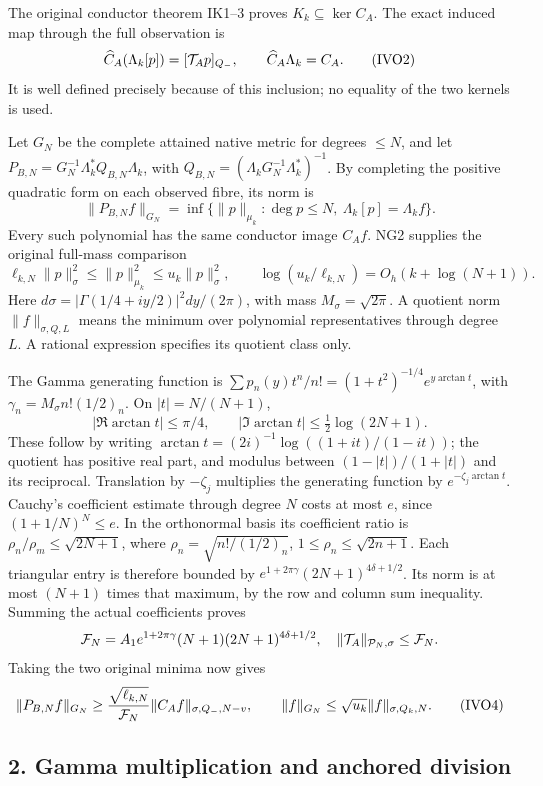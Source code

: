 The original conductor theorem IK1--3 proves \(K_k\subseteq\ker C_A\). The exact induced map through the full observation is \[
\widehat C_A(\Lambda_k[p])=[{\cal T}_Ap]_{Q_-},\qquad
\widehat C_A\Lambda_k=C_A.
\tag{IVO2}
\] It is well defined precisely because of this inclusion; no equality of the two kernels is used.

Let \(G_N\) be the complete attained native metric for degrees \(\le N\), and let \(P_{B,N}=G_N^{-1}\Lambda_k^*Q_{B,N}\Lambda_k\), with \(Q_{B,N}=(\Lambda_kG_N^{-1}\Lambda_k^*)^{-1}\). By completing the positive quadratic form on each observed fibre, its norm is \[
\|P_{B,N}f\|_{G_N}
=\inf\{\|p\|_{\mu_k}:\deg p\le N,\ \Lambda_k[p]=\Lambda_kf\}.
\] Every such polynomial has the same conductor image \(C_Af\). NG2 supplies the original full-mass comparison \[
\ell_{k,N}\|p\|_\sigma^2\le\|p\|_{\mu_k}^2\le u_k\|p\|_\sigma^2,\qquad
\log(u_k/\ell_{k,N})=O_h(k+\log(N+1)).
\tag{IVO3}
\] Here \(d\sigma=|\Gamma(1/4+iy/2)|^2dy/(2\pi)\), with mass \(M_\sigma=\sqrt{2\pi}\). A quotient norm \(\|f\|_{\sigma,Q,L}\) means the minimum over polynomial representatives through degree \(L\). A rational expression specifies its quotient class only.

The Gamma generating function is \(\sum p_n(y)t^n/n!=(1+t^2)^{-1/4}e^{y\arctan t}\), with \(\gamma_n=M_\sigma n!(1/2)_n\). On \(|t|=N/(N+1)\), \[
|\Re\arctan t|\le\pi/4,\qquad
|\Im\arctan t|\le\tfrac12\log(2N+1).
\] These follow by writing \(\arctan t=(2i)^{-1}\log((1+it)/(1-it))\); the quotient has positive real part, and modulus between \((1-|t|)/(1+|t|)\) and its reciprocal. Translation by \(-\zeta_j\) multiplies the generating function by \(e^{-\zeta_j\arctan t}\). Cauchy's coefficient estimate through degree \(N\) costs at most \(e\), since \((1+1/N)^N\le e\). In the orthonormal basis its coefficient ratio is \(\rho_n/\rho_m\le\sqrt{2N+1}\), where \(\rho_n=\sqrt{n!/(1/2)_n}\), \(1\le\rho_n\le\sqrt{2n+1}\). Each triangular entry is therefore bounded by \(e^{1+2\pi\gamma}(2N+1)^{4\delta+1/2}\). Its norm is at most \((N+1)\) times that maximum, by the row and column sum inequality. Summing the actual coefficients proves \[
{\cal F}_N=A_1e^{1+2\pi\gamma}(N+1)(2N+1)^{4\delta+1/2},\quad
\|{\cal T}_A\|_{\mathcal P_N,\sigma}\le{\cal F}_N.
\] Taking the two original minima now gives \[
\|P_{B,N}f\|_{G_N}\ge
\frac{\sqrt{\ell_{k,N}}}{{\cal F}_N}\|C_Af\|_{\sigma,Q_-,N-v},
\qquad
\|f\|_{G_N}\le\sqrt{u_k}\|f\|_{\sigma,Q_k,N}.
\tag{IVO4}
\]

\subsection{2. Gamma multiplication and anchored division}\label{gamma-multiplication-and-anchored-division}

